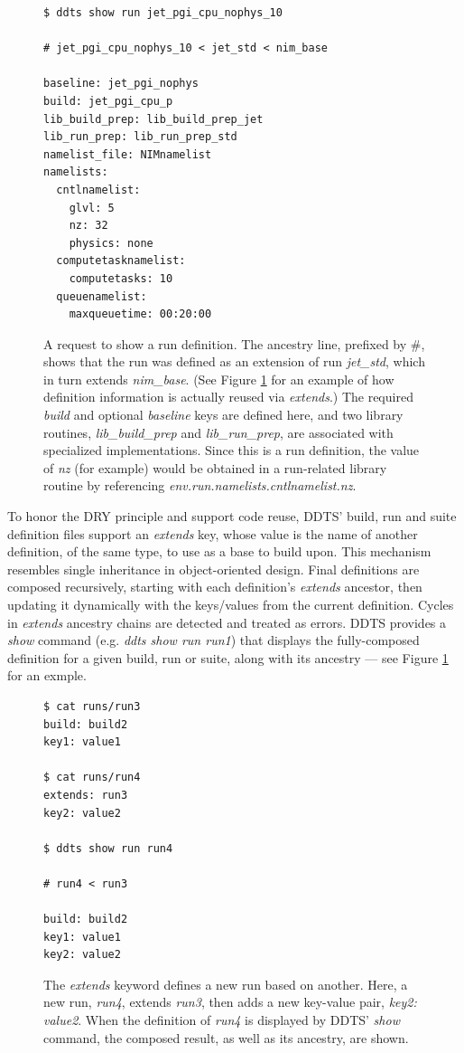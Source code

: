 \documentclass[conference]{IEEEtran}
\begin{document}
\begin{figure}[!t]
\begin{verbatim}
$ ddts show run jet_pgi_cpu_nophys_10

# jet_pgi_cpu_nophys_10 < jet_std < nim_base

baseline: jet_pgi_nophys
build: jet_pgi_cpu_p
lib_build_prep: lib_build_prep_jet
lib_run_prep: lib_run_prep_std
namelist_file: NIMnamelist
namelists:
  cntlnamelist:
    glvl: 5
    nz: 32
    physics: none
  computetasknamelist:
    computetasks: 10
  queuenamelist:
    maxqueuetime: 00:20:00
\end{verbatim}
\caption{A request to show a run definition. The ancestry line, prefixed by \#, shows that the run was defined as an extension of run \emph{jet\_std}, which in turn extends \emph{nim\_base}. (See Figure \ref{figure:3} for an example of how definition information is actually reused via \emph{extends}.) The required \emph{build} and optional \emph{baseline} keys are defined here, and two library routines, \emph{lib\_build\_prep} and \emph{lib\_run\_prep}, are associated with specialized implementations. Since this is a run definition, the value of \emph{nz} (for example) would be obtained in a run-related library routine by referencing \emph{env.run.namelists.cntlnamelist.nz}.}
\label{figure:3}
\end{figure}

To honor the DRY principle and support code reuse, DDTS' build, run and suite definition files support an \emph{extends} key, whose value is the name of another definition, of the same type, to use as a base to build upon. This mechanism resembles single inheritance in object-oriented design. Final definitions are composed recursively, starting with each definition's \emph{extends} ancestor, then updating it dynamically with the keys/values from the current definition. Cycles in \emph{extends} ancestry chains are detected and treated as errors. DDTS provides a \emph{show} command (e.g. \emph{ddts show run run1}) that displays the fully-composed definition for a given build, run or suite, along with its ancestry --- see Figure \ref{figure:3} for an exmple.

\begin{figure}[!t]
\begin{verbatim}
$ cat runs/run3
build: build2
key1: value1

$ cat runs/run4
extends: run3
key2: value2

$ ddts show run run4

# run4 < run3

build: build2
key1: value1
key2: value2
\end{verbatim}
\caption{The \emph{extends} keyword defines a new run based on another. Here, a new run, \emph{run4}, extends \emph{run3}, then adds a new key-value pair, \emph{key2: value2}. When the definition of \emph{run4} is displayed by DDTS' \emph{show} command, the composed result, as well as its ancestry, are shown.}
\label{figure:4}
\end{figure}
\end{document}
